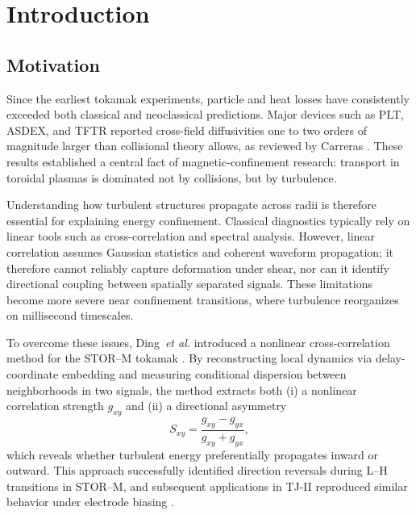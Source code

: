 \documentclass[12pt]{article}
\begin{document}

\section{Introduction}

\subsection{Motivation}

Since the earliest tokamak experiments, particle and heat losses have consistently exceeded both
classical and neoclassical predictions. Major devices such as PLT, ASDEX, and TFTR reported
cross-field diffusivities one to two orders of magnitude larger than collisional theory allows, as
reviewed by Carreras \cite{carrerasProgressAnomalousTransport1997}. These results established a
central fact of magnetic-confinement research: transport in toroidal plasmas is dominated not by
collisions, but by turbulence.

Understanding how turbulent structures propagate across radii is therefore essential for explaining
energy confinement. Classical diagnostics typically rely on linear tools such as cross-correlation
and spectral analysis. However, linear correlation assumes Gaussian statistics and coherent
waveform propagation; it therefore cannot reliably capture deformation under shear, nor can it
identify directional coupling between spatially separated signals. These limitations become more
severe near confinement transitions, where turbulence reorganizes on millisecond timescales.

To overcome these issues, Ding~\textit{et al.} introduced a nonlinear cross-correlation method for
the STOR--M tokamak \cite{dingNonlinearRadialCorrelation1997}. By reconstructing local
dynamics via delay-coordinate embedding \cite{takensDetectingStrangeAttractors1981,
gutmanTakensEmbeddingTheorem2015} and measuring conditional dispersion between neighborhoods
in two signals, the method extracts both (i) a nonlinear correlation strength $g_{xy}$ and
(ii) a directional asymmetry
\[
S_{xy} = \frac{g_{xy}-g_{yx}}{g_{xy}+g_{yx}},
\]
which reveals whether turbulent energy preferentially propagates inward or outward. This approach
successfully identified direction reversals during L--H transitions in STOR--M, and subsequent
applications in TJ-II reproduced similar behavior under electrode biasing
\cite{bsharatConditionalCrosscorrelationAnalysis2024}.
\end{document}
